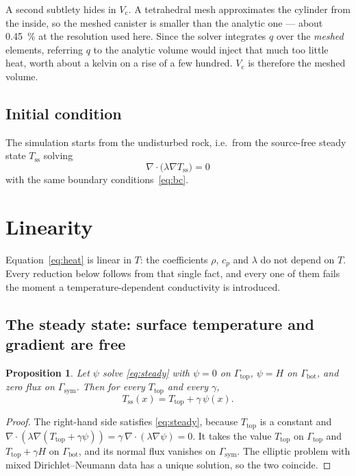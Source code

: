 \documentclass[11pt,a4paper]{article}
\theoremstyle{plain}
\newtheorem{proposition}{Proposition}
\newcommand{\Tss}{T_{\mathrm{ss}}}
\newcommand{\Ttop}{T_{\mathrm{top}}}
\begin{document}
A second subtlety hides in $V_{\mathrm{c}}$. A tetrahedral mesh approximates
the cylinder from the inside, so the meshed canister is smaller than the
analytic one --- about \SI{0.45}{\percent} at the resolution used here. Since
the solver integrates $q$ over the \emph{meshed} elements, referring $q$ to the
analytic volume would inject that much too little heat, worth about a kelvin on
a rise of a few hundred. $V_{\mathrm{c}}$ is therefore the meshed volume.

\subsection{Initial condition}

The simulation starts from the undisturbed rock, i.e.\ from the source-free
steady state $\Tss$ solving
\begin{equation}
  \nabla\cdot\bigl(\lambda \nabla \Tss\bigr) = 0
  \label{eq:steady}
\end{equation}
with the same boundary conditions~\eqref{eq:bc}.

\section{Linearity}

Equation~\eqref{eq:heat} is linear in $T$: the coefficients $\rho$, $c_p$ and
$\lambda$ do not depend on $T$. Every reduction below follows from that single
fact, and every one of them fails the moment a temperature-dependent
conductivity is introduced.

\subsection{The steady state: surface temperature and gradient are free}

\begin{proposition}\label{prop:psi}
Let $\psi$ solve \eqref{eq:steady} with $\psi = 0$ on $\Gamma_{\mathrm{top}}$,
$\psi = H$ on $\Gamma_{\mathrm{bot}}$, and zero flux on
$\Gamma_{\mathrm{sym}}$. Then for every $\Ttop$ and every $\gamma$,
\begin{equation}
  \Tss(x) = \Ttop + \gamma\,\psi(x).
  \label{eq:tss}
\end{equation}
\end{proposition}

\begin{proof}
The right-hand side satisfies \eqref{eq:steady}, because $\Ttop$ is a constant
and $\nabla\cdot(\lambda\nabla(\Ttop + \gamma\psi)) = \gamma\,
\nabla\cdot(\lambda\nabla\psi) = 0$. It takes the value $\Ttop$ on
$\Gamma_{\mathrm{top}}$ and $\Ttop + \gamma H$ on $\Gamma_{\mathrm{bot}}$, and
its normal flux vanishes on $\Gamma_{\mathrm{sym}}$. The elliptic problem with
mixed Dirichlet--Neumann data has a unique solution, so the two coincide.
\end{proof}
\end{document}
